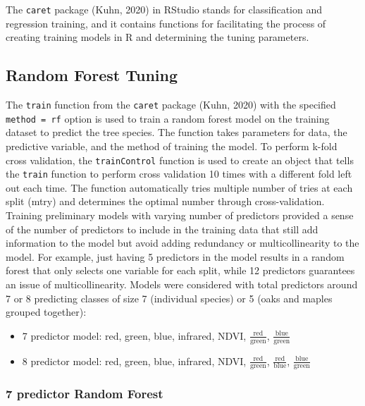 \documentclass[12pt,twoside]{reedthesis}
\begin{document}
The \texttt{caret} package (Kuhn, 2020) in RStudio stands for classification and regression training, and it contains functions for facilitating the process of creating training models in R and determining the tuning parameters.

\hypertarget{random-forest-tuning}{%
\subsection{Random Forest Tuning}\label{random-forest-tuning}}

The \texttt{train} function from the \texttt{caret} package (Kuhn, 2020) with the specified \texttt{method\ =\ rf} option is used to train a random forest model on the training dataset to predict the tree species. The function takes parameters for data, the predictive variable, and the method of training the model. To perform k-fold cross validation, the \texttt{trainControl} function is used to create an object that tells the \texttt{train} function to perform cross validation 10 times with a different fold left out each time. The function automatically tries multiple number of tries at each split (mtry) and determines the optimal number through cross-validation. Training preliminary models with varying number of predictors provided a sense of the number of predictors to include in the training data that still add information to the model but avoid adding redundancy or multicollinearity to the model. For example, just having 5 predictors in the model results in a random forest that only selects one variable for each split, while 12 predictors guarantees an issue of multicollinearity. Models were considered with total predictors around 7 or 8 predicting classes of size 7 (individual species) or 5 (oaks and maples grouped together):
\begin{itemize}
\item
  7 predictor model: red, green, blue, infrared, NDVI, \(\frac{\mbox{red}}{\mbox{green}}\), \(\frac{\mbox{blue}}{\mbox{green}}\)
\item
  8 predictor model: red, green, blue, infrared, NDVI, \(\frac{\mbox{red}}{\mbox{green}}\), \(\frac{\mbox{red}}{\mbox{blue}}\), \(\frac{\mbox{blue}}{\mbox{green}}\)
\end{itemize}
\hypertarget{predictor-random-forest}{%
\subsubsection{7 predictor Random Forest}\label{predictor-random-forest}}
\end{document}

